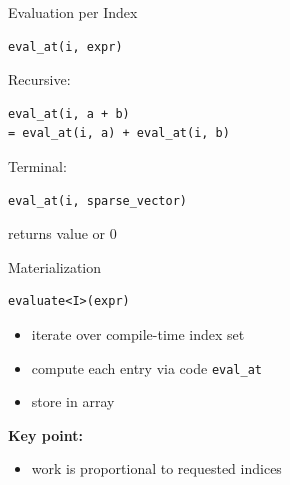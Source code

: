 \documentclass{beamer}
\begin{document}
\begin{frame}[fragile]{Evaluation per Index}

\begin{lstlisting}
eval_at(i, expr)
\end{lstlisting}

\vspace{1em}

Recursive:

\begin{lstlisting}
eval_at(i, a + b)
= eval_at(i, a) + eval_at(i, b)
\end{lstlisting}

\vspace{1em}

Terminal:

\begin{lstlisting}
eval_at(i, sparse_vector)
\end{lstlisting}

returns value or 0

\end{frame}


\begin{frame}[fragile]{Materialization}

\begin{lstlisting}
evaluate<I>(expr)
\end{lstlisting}

\vspace{1em}

\begin{itemize}
\item iterate over compile-time index set
\item compute each entry via code \lstinline!eval_at!
\item store in array
\end{itemize}

\vspace{1em}

\textbf{Key point:}
\begin{itemize}
\item work is proportional to requested indices
\end{itemize}

\end{frame}

\end{document}
